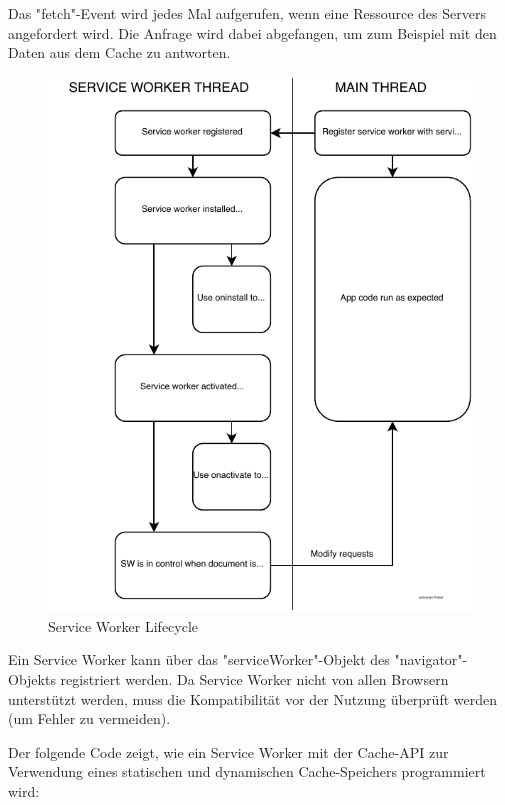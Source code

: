 
Das "{\ttfamily fetch}"-Event wird jedes Mal aufgerufen, wenn eine Ressource des Servers angefordert wird. Die Anfrage wird dabei abgefangen, um zum Beispiel mit den Daten aus dem Cache zu antworten.

\begin{figure}[H]
    \centering
    \includegraphics{media/ServiceWorker/lifecycle.svg.pdf}
    \caption{Service Worker Lifecycle}
\end{figure}


Ein Service Worker kann über das "{\ttfamily serviceWorker}"-Objekt des "{\ttfamily navigator}"-Objekts registriert werden. 
Da Service Worker nicht von allen Browsern unterstützt werden, muss die Kompatibilität vor der Nutzung überprüft werden (um Fehler zu vermeiden).


\label{sec:cacheImpl}

Der folgende Code zeigt, wie ein Service Worker mit der Cache-API zur Verwendung eines statischen und dynamischen Cache-Speichers programmiert wird:

